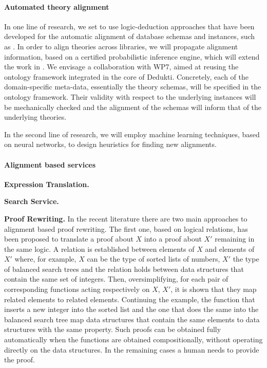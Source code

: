 \paragraph{Automated theory alignment}

In one line of research, we set to use logic-deduction approaches that
have been developed for the automatic alignment of database schemas
and instances, such as \cite{}.  In order to align theories across
libraries, we will propagate alignment information, based on a
certified probabilistic inference engine, which will extend the work
in \cite{}. We envisage a collaboration with WP7, aimed at reusing the
ontology framework integrated in the core of Dedukti. Concretely, each
of the domain-specific meta-data, essentially the theory schemas, will
be specified in the ontology framework. Their validity with respect to
the underlying instances will be mechanically checked and the
alignment of the schemas will inform that of the underlying theories.

In the second line of research, we will employ machine learning
techniques, based on neural networks, to design heuristics for finding
new alignments.

\paragraph{Alignment based services}

\textbf{Expression Translation.}

\textbf{Search Service.}

\textbf{Proof Rewriting.} In the recent literature there are two main
approaches to alignment based proof rewriting. The first one, based on
logical relations, has been proposed to translate a proof about $X$
into a proof about $X'$ remaining in the same logic. A relation is
established between elements of $X$ and elements of $X'$ where, for
example, $X$ can be the type of sorted lists of numbers, $X'$ the type
of balanced search trees and the relation holds between data
structures that contain the same set of integers. Then,
oversimplifying, for each pair of corresponding functions acting
respectively on $X$, $X'$, it is shown that they map related elements
to related elements. Continuing the example, the function that inserts
a new integer into the sorted list and the one that does the same into
the balanced search tree map data structures that contain the same
elements to data structures with the same property. Such proofs can be
obtained fully automatically when the functions are obtained
compositionally, without operating directly on the data structures. In
the remaining cases a human needs to provide the proof.

